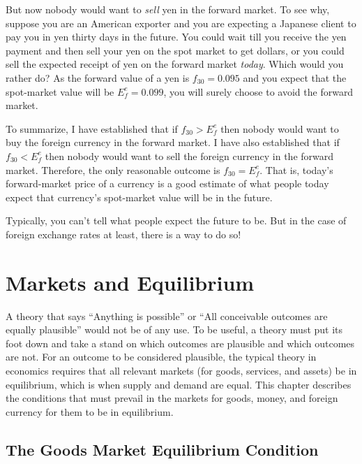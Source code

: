 \documentclass[
  letterpaper,
]{book}
\theoremstyle{plain}
\theoremstyle{remark}
\begin{document}
But now nobody would want to \emph{sell} yen in the forward market. To
see why, suppose you are an American exporter and you are expecting a
Japanese client to pay you in yen thirty days in the future. You could
wait till you receive the yen payment and then sell your yen on the spot
market to get dollars, or you could sell the expected receipt of yen on
the forward market \emph{today}. Which would you rather do? As the
forward value of a yen is \(f_{30} = 0.095\) and you expect that the
spot-market value will be \(E_f^e =0.099\), you will surely choose to
avoid the forward market.

To summarize, I have established that if \(f_{30} > E_f^e\) then nobody
would want to buy the foreign currency in the forward market. I have
also established that if \(f_{30} < E_f^e\) then nobody would want to
sell the foreign currency in the forward market. Therefore, the only
reasonable outcome is \(f_{30} = E_f^e\). That is, today's
forward-market price of a currency is a good estimate of what people
today expect that currency's spot-market value will be in the future.

Typically, you can't tell what people expect the future to be. But in
the case of foreign exchange rates at least, there is a way to do so!


\chapter{Markets and Equilibrium}\label{sec-basicequations}

A theory that says ``Anything is possible'' or ``All conceivable
outcomes are equally plausible'' would not be of any use. To be useful,
a theory must put its foot down and take a stand on which outcomes are
plausible and which outcomes are not. For an outcome to be considered
plausible, the typical theory in economics requires that all relevant
markets (for goods, services, and assets) be in equilibrium, which is
when supply and demand are equal. This chapter describes the conditions
that must prevail in the markets for goods, money, and foreign currency
for them to be in equilibrium.

\section{The Goods Market Equilibrium Condition}\label{sec-goodseqm}

\end{document}
